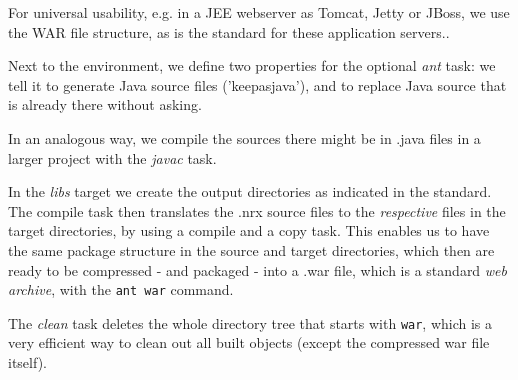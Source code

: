 For universal usability, e.g. in a JEE webserver as Tomcat, Jetty or
JBoss, we use the WAR file structure, as is the standard for these
application servers..

Next to the environment, we define two properties for the \nr{}
optional \emph{ant} task: we tell it to generate Java source files ('keepasjava'), and
to replace Java source that is already there without asking.



In an analogous way, we compile the sources there might be in .java
files in a larger project with the \emph{javac} task. 

In the \emph{libs} target we create the output directories as
indicated in the standard. The compile task then translates the .nrx
source files to the \emph{respective} files in the target
directories, by using a compile and a copy task. This enables us to
have the same package structure in the source and target directories,
which then are ready to be compressed - and packaged - into a .war
file, which is a standard \emph{web archive}, with the \texttt{ant war} command.


The \emph{clean} task deletes the whole directory tree that starts
with \texttt{war}, which is a very efficient way to clean out all
built objects (except the compressed war file itself).
